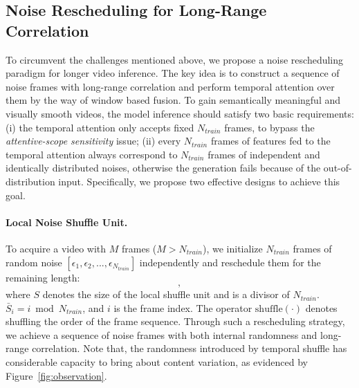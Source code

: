 \subsection{Noise Rescheduling for Long-Range Correlation}
\label{subsec:noise_rescheduling}

To circumvent the challenges mentioned above, we propose a noise rescheduling paradigm for longer video inference. The key idea is to construct a sequence of noise frames with long-range correlation and perform temporal attention over them by the way of window based fusion.
%
To gain semantically meaningful and visually smooth videos, the model inference should satisfy two basic requirements: (i) the temporal attention only accepts fixed $N_{train}$ frames, to bypass the \textit{attentive-scope sensitivity} issue; (ii) every $N_{train}$ frames of features fed to the temporal attention always correspond to $N_{train}$ frames of independent and identically distributed noises, otherwise the generation fails because of the out-of-distribution input.
Specifically, we propose two effective designs to achieve this goal. 

\paragraph{Local Noise Shuffle Unit.}
To acquire a video with $M$ frames ($M > N_{train}$), we initialize $N_{train}$ frames of random noise $[\epsilon_1, \epsilon_2, ..., \epsilon_{N_{train}}]$ independently and reschedule them for the remaining length:
%
\begin{equation}
[\epsilon_1, \epsilon_2, ..., \epsilon_{N_{train}}, \mathrm{shuffle}(\epsilon_1, \epsilon_2, ..., \epsilon_S), ..., \mathrm{shuffle}(\epsilon_{\bar{S}_{(i+1)}}, \epsilon_{\bar{S}_{(i+2)}}, ..., \epsilon_{\bar{S}_{(i+S)}}), ...],
\end{equation}
%
where $S$ denotes the size of the local shuffle unit and is a divisor of $N_{train}$. $\bar{S}_i = i \bmod {N_{train}}$, and $i$ is the frame index. The operator $\mathrm{shuffle}(\cdot)$ denotes shuffling the order of the frame sequence. Through such a rescheduling strategy, we achieve a sequence of noise frames with both internal randomness and long-range correlation. Note that, the randomness introduced by temporal shuffle has considerable capacity to bring about content variation, as evidenced by Figure~\ref{fig:observation}.

